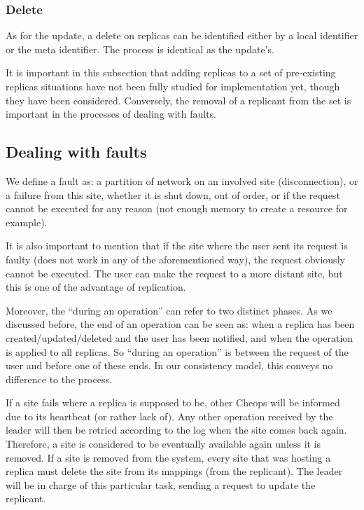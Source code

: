 \subsubsection{Delete}

As for the update, a delete on replicas can be identified either by a
local identifier or the meta identifier.
%
The process is identical as the update's.

It is important in this subsection that adding replicas to a set of
pre-existing replicas situations have not been fully studied for
implementation yet, though they have been considered.
%
Conversely, the removal of a replicant from the set is important in
the processes of dealing with faults.


\subsection{Dealing with faults}


We define a fault as: a partition of network on an involved site
(disconnection), or a failure from this site, whether it is shut down,
out of order, or if the request cannot be executed for any reason (not
enough memory to create a resource for example).

It is also important to mention that if the site where the user sent
its request is faulty (does not work in any of the aforementioned
way), the request obviously cannot be executed.
%
The user can make the request to a more distant site, but this is one
of the advantage of replication.

Moreover, the ``during an operation'' can refer to two distinct
phases.
%
As we discussed before, the end of an operation can be seen
as: when a replica has been created/updated/deleted and the user has
been notified, and when the operation is applied to all replicas.
%
So ``during an operation'' is between the request of the user and
before one of these ends.
%
In our consistency model, this conveys no difference to the process.

If a site fails where a replica is supposed to be, other Cheops will
be informed due to its heartbeat (or rather lack of).
%
Any other operation received by the leader will then be retried
according to the log when the site comes back again.
%
Therefore, a site is considered to be eventually available again
unless it is removed.
%
If a site is removed from the system, every site that was hosting a
replica must delete the site from its mappings (from the replicant).
%
The leader will be in charge of this particular task, sending a
request to update the replicant.


